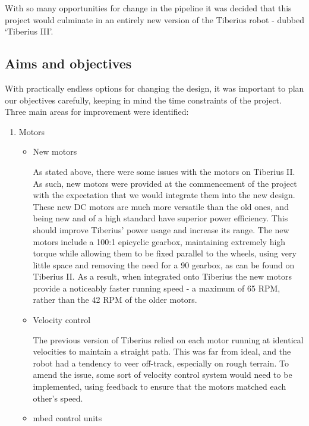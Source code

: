 With so many opportunities for change in the pipeline it was decided that this project would culminate in an entirely new version of the Tiberius robot - dubbed `Tiberius III'.
\subsection{Aims and objectives}

With practically endless options for changing the design, it was important to plan our objectives carefully, keeping in mind the time constraints of the project. Three main areas for improvement were identified:

\begin{enumerate}
	\item Motors
	\begin{itemize}
    	\item New motors
    
    	As stated above, there were some issues with the motors on Tiberius II. As such, new motors were provided at the commencement of the project with the expectation that we would integrate them into the new design. These new DC motors are much more versatile than the old ones, and being new and of a high standard have superior power efficiency. This should improve Tiberius' power usage and increase its range.
        \newline
        The new motors include a 100:1 \gls{epicyclic gearbox}, maintaining extremely high torque while allowing them to be fixed parallel to the wheels, using very little space and removing the need for a 90\degree{} gearbox, as can be found on Tiberius II.
        \newline
        As a result, when integrated onto Tiberius the new motors provide a noticeably faster running speed - a maximum of 65 \gls{RPM}, rather than the 42 \gls{RPM} of the older motors.

    	\item Velocity control
        
        The previous version of Tiberius relied on each motor running at identical velocities to maintain a straight path. This was far from ideal, and the robot had a tendency to veer off-track, especially on rough terrain. To amend the issue, some sort of velocity control system would need to be implemented, using feedback to ensure that the motors matched each other's speed.
        
       	\item mbed control units
        

\end{itemize}
\end{enumerate}
